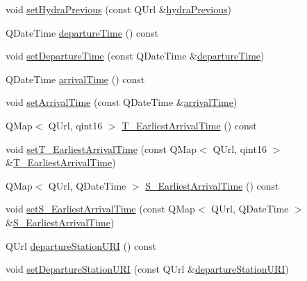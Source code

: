 \begin{DoxyCompactItemize}
\item 
void \mbox{\hyperlink{classQRail_1_1RouterEngine_1_1Journey_acdb5fa099702119d04b57b23737e2bdf}{set\+Hydra\+Previous}} (const Q\+Url \&\mbox{\hyperlink{classQRail_1_1RouterEngine_1_1Journey_a670dbe08bcc3ce8e8003a0429661e18f}{hydra\+Previous}})
\item 
Q\+Date\+Time \mbox{\hyperlink{classQRail_1_1RouterEngine_1_1Journey_a58b92b24d9d29ebb3cb47994b92eaa13}{departure\+Time}} () const
\item 
void \mbox{\hyperlink{classQRail_1_1RouterEngine_1_1Journey_a4a03bbbfcbdc80e1d040598959ae4743}{set\+Departure\+Time}} (const Q\+Date\+Time \&\mbox{\hyperlink{classQRail_1_1RouterEngine_1_1Journey_a58b92b24d9d29ebb3cb47994b92eaa13}{departure\+Time}})
\item 
Q\+Date\+Time \mbox{\hyperlink{classQRail_1_1RouterEngine_1_1Journey_a8a4e6733fceea2902fc3b0f5cb6b077c}{arrival\+Time}} () const
\item 
void \mbox{\hyperlink{classQRail_1_1RouterEngine_1_1Journey_aed24efbeb5390322b6b2bde3034cbe88}{set\+Arrival\+Time}} (const Q\+Date\+Time \&\mbox{\hyperlink{classQRail_1_1RouterEngine_1_1Journey_a8a4e6733fceea2902fc3b0f5cb6b077c}{arrival\+Time}})
\item 
Q\+Map$<$ Q\+Url, qint16 $>$ \mbox{\hyperlink{classQRail_1_1RouterEngine_1_1Journey_a2c6e80f1152cc373c95361db4fe295e4}{T\+\_\+\+Earliest\+Arrival\+Time}} () const
\item 
void \mbox{\hyperlink{classQRail_1_1RouterEngine_1_1Journey_af477bba913bb4326528a2f9dcd2b2e82}{set\+T\+\_\+\+Earliest\+Arrival\+Time}} (const Q\+Map$<$ Q\+Url, qint16 $>$ \&\mbox{\hyperlink{classQRail_1_1RouterEngine_1_1Journey_a2c6e80f1152cc373c95361db4fe295e4}{T\+\_\+\+Earliest\+Arrival\+Time}})
\item 
Q\+Map$<$ Q\+Url, Q\+Date\+Time $>$ \mbox{\hyperlink{classQRail_1_1RouterEngine_1_1Journey_a7fe25d3e03ff906868d6892b80008041}{S\+\_\+\+Earliest\+Arrival\+Time}} () const
\item 
void \mbox{\hyperlink{classQRail_1_1RouterEngine_1_1Journey_acff9510bc00a4f052c28ee6151518d4d}{set\+S\+\_\+\+Earliest\+Arrival\+Time}} (const Q\+Map$<$ Q\+Url, Q\+Date\+Time $>$ \&\mbox{\hyperlink{classQRail_1_1RouterEngine_1_1Journey_a7fe25d3e03ff906868d6892b80008041}{S\+\_\+\+Earliest\+Arrival\+Time}})
\item 
Q\+Url \mbox{\hyperlink{classQRail_1_1RouterEngine_1_1Journey_ad541f71d07fc32b762463cf4241d03db}{departure\+Station\+U\+RI}} () const
\item 
void \mbox{\hyperlink{classQRail_1_1RouterEngine_1_1Journey_a6001845dd7a206a719712a28a1c0a097}{set\+Departure\+Station\+U\+RI}} (const Q\+Url \&\mbox{\hyperlink{classQRail_1_1RouterEngine_1_1Journey_ad541f71d07fc32b762463cf4241d03db}{departure\+Station\+U\+RI}})

\end{DoxyCompactItemize}
